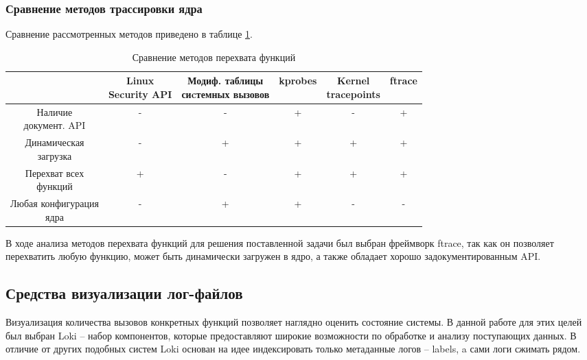\subsubsection{Сравнение методов трассировки ядра}

Сравнение рассмотренных методов приведено в таблице \ref{methods}.

\begin{table}[H]
	\caption{Сравнение методов перехвата функций}
	\label{methods}
	\small
	\begin{tabular}{|c|c|c|c|c|c|}
		\hline
		& \specialcell{Linux\\Security API} & \specialcell{Модиф. таблицы\\сиcтемных вызовов} & kprobes & \specialcell{Kernel\\tracepoints} & ftrace\\ \hline
		\specialcell{Наличие\\документ. API} & - & - & + & - & + \\ \hline
		\specialcell{Динамическая\\загрузка} & - & + & + & + & + \\ \hline
		\specialcell{Перехват всех\\функций} & + & - & + & + & + \\ \hline
		\specialcell{Любая конфигурация\\ядра} & - & + & + & - & - \\ \hline
	\end{tabular}
\end{table}

\pagebreak

В ходе анализа методов перехвата функций для решения поставленной задачи был выбран фреймворк ftrace, так как он позволяет перехватить любую функцию, может быть динамически загружен в ядро, а также обладает хорошо задокументированным API.

\subsection{Средства визуализации лог-файлов}

Визуализация количества вызовов конкретных функций позволяет наглядно оценить состояние системы.
В данной работе для этих целей был выбран Loki \cite{docloki} -- набор компонентов, которые предоставляют широкие возможности по обработке и анализу поступающих данных. В отличие от других подобных систем Loki основан на идее индексировать только метаданные логов -- labels, a сами логи сжимать рядом.

